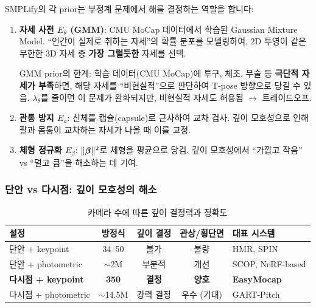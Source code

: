 \documentclass[11pt, a4paper]{report}
\begin{document}
SMPLify의 각 prior는 부정계 문제에서 해를 결정하는 역할을 합니다:

\begin{enumerate}[leftmargin=*]
  \item \textbf{자세 사전 $E_\theta$ (GMM)}: CMU MoCap 데이터에서 학습된 Gaussian Mixture Model.
  ``인간이 실제로 취하는 자세''의 확률 분포를 모델링하여,
  2D 투영이 같은 무한한 3D 자세 중 \textbf{가장 그럴듯한} 자세를 선택.

  \begin{warningbox}
  GMM prior의 한계: 학습 데이터(CMU MoCap)에 투구, 체조, 무술 등 \textbf{극단적 자세가 부족}하면,
  해당 자세를 ``비현실적''으로 판단하여 T-pose 방향으로 당길 수 있음.
  $\lambda_\theta$를 줄이면 이 문제가 완화되지만, 비현실적 자세도 허용됨 $\rightarrow$ 트레이드오프.
  \end{warningbox}

  \item \textbf{관통 방지 $E_a$}: 신체를 캡슐(capsule)로 근사하여 교차 검사.
  깊이 모호성으로 인해 팔과 몸통이 교차하는 자세가 나올 때 이를 교정.

  \item \textbf{체형 정규화 $E_\beta$}: $\|\bm{\beta}\|^2$로 체형을 평균으로 당김.
  깊이 모호성에서 ``가깝고 작음'' vs ``멀고 큼''을 해소하는 데 기여.
\end{enumerate}


\subsubsection{단안 vs 다시점: 깊이 모호성의 해소}

\begin{table}[H]
\centering
\caption{카메라 수에 따른 깊이 결정력과 정확도}
\renewcommand{\arraystretch}{1.3}
\small
\begin{tabularx}{\textwidth}{lcccX}
\toprule
\textbf{설정} & \textbf{방정식} & \textbf{깊이 결정} & \textbf{관상/횡단면} & \textbf{대표 시스템} \\
\midrule
단안 + keypoint & 34--50 & 불가 & 불량 & HMR, SPIN \\
단안 + photometric & $\sim$2M & 부분적 & 개선 & SCOP, NeRF-based \\
\textbf{다시점 + keypoint} & \textbf{350} & \textbf{결정} & \textbf{양호} & \textbf{EasyMocap} \\
다시점 + photometric & $\sim$14.5M & 강력 결정 & 우수 (기대) & GART-Pitch \\
\bottomrule
\end{tabularx}
\end{table}
\end{document}
